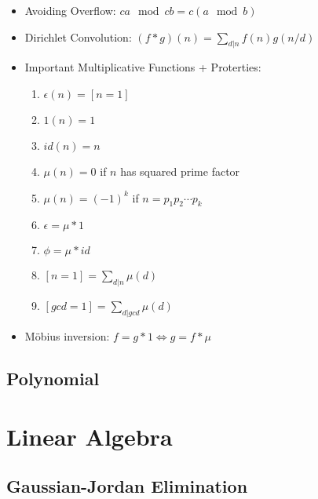 \documentclass[a4paper,10pt,twocolumn,oneside,x11names]{article}
\begin{document}
{\begin{itemize}
    \item Avoiding Overflow:
    $ca \mod cb = c(a \mod b)$
    
    \item Dirichlet Convolution: $(f * g)(n) = \sum_{d|n} f(n)g(n/d)$
    
    \item Important Multiplicative Functions + Proterties:
    \begin{enumerate}[nolistsep]
        \item $\epsilon(n) = [n = 1]$
        \item $1(n) = 1$
        \item $id(n) = n$
        \item $\mu(n) = 0$ if $n$ has squared prime factor
        \item $\mu(n) = (-1)^k$ if $n = p_1 p_2 \cdots p_k$
        \item $\epsilon = \mu * 1$
        \item $\phi = \mu * id$
        \item $[n=1] = \sum_{d|n} \mu(d)$
        \item $[gcd=1] = \sum_{d|gcd} \mu(d)$
    \end{enumerate}
    
    \item Möbius inversion:
    $f = g * 1 \Leftrightarrow g = f * \mu$
\end{itemize}}

\subsection{Polynomial}


\section{Linear Algebra}

\subsection{Gaussian-Jordan Elimination}

\end{document}
